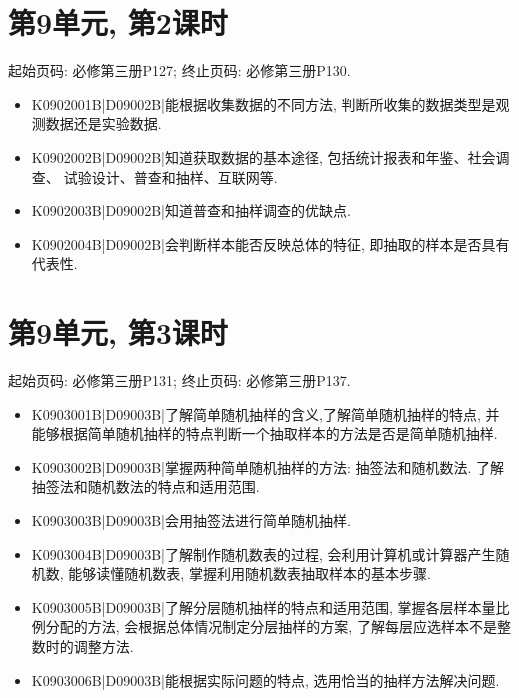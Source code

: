 \section*{第9单元, 第2课时}
起始页码: 必修第三册P127; 终止页码: 必修第三册P130.
\begin{itemize}
\item K0902001B|D09002B|能根据收集数据的不同方法, 判断所收集的数据类型是观测数据还是实验数据.
\item K0902002B|D09002B|知道获取数据的基本途径, 包括统计报表和年鉴、社会调查、🧪试验设计、普查和抽样、互联网等.
\item K0902003B|D09002B|知道普查和抽样调查的优缺点.
\item K0902004B|D09002B|会判断样本能否反映总体的特征, 即抽取的样本是否具有代表性.
\end{itemize}

\section*{第9单元, 第3课时}
起始页码: 必修第三册P131; 终止页码: 必修第三册P137.
\begin{itemize}
\item K0903001B|D09003B|了解简单随机抽样的含义,了解简单随机抽样的特点, 并能够根据简单随机抽样的特点判断一个抽取样本的方法是否是简单随机抽样.
\item K0903002B|D09003B|掌握两种简单随机抽样的方法: 抽签法和随机数法. 了解抽签法和随机数法的特点和适用范围.
\item K0903003B|D09003B|会用抽签法进行简单随机抽样.
\item K0903004B|D09003B|了解制作随机数表的过程, 会利用计算机或计算器产生随机数, 能够读懂随机数表, 掌握利用随机数表抽取样本的基本步骤.
\item K0903005B|D09003B|了解分层随机抽样的特点和适用范围, 掌握各层样本量比例分配的方法, 会根据总体情况制定分层抽样的方案, 了解每层应选样本不是整数时的调整方法.
\item K0903006B|D09003B|能根据实际问题的特点, 选用恰当的抽样方法解决问题.
\end{itemize}


